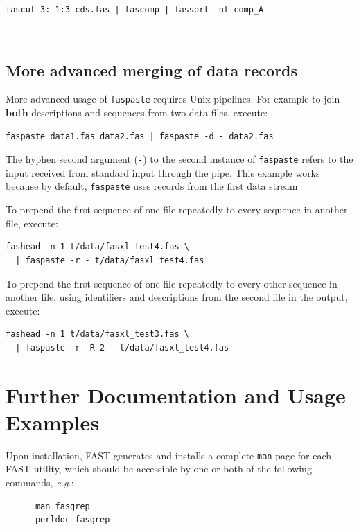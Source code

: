\documentclass{frontiersSCNS} %
\begin{document}
\begin{verbatim}
fascut 3:-1:3 cds.fas | fascomp | fassort -nt comp_A
\end{verbatim}
\\
\subsection{More advanced merging of data records}

More advanced usage of {\tt faspaste} requires Unix pipelines. For
example to join {\bf both} descriptions and sequences from two
data-files, execute:

\begin{verbatim}
faspaste data1.fas data2.fas | faspaste -d - data2.fas
\end{verbatim}

\noindent The hyphen second argument (\verb|-|) to the second instance
of {\tt faspaste} refers to the input received from standard input
through the pipe. This example works because by default,  {\tt  faspaste} uses records from the first data stream 

\noindent To prepend the first sequence of one file repeatedly to every sequence in another
file, execute:

\begin{verbatim}
fashead -n 1 t/data/fasxl_test4.fas \ 
  | faspaste -r - t/data/fasxl_test4.fas
\end{verbatim}

\noindent To prepend the first sequence of one file repeatedly to
every other sequence in another file, using identifiers and
descriptions from the second file in the output, execute:

\begin{verbatim}
fashead -n 1 t/data/fasxl_test3.fas \ 
  | faspaste -r -R 2 - t/data/fasxl_test4.fas
\end{verbatim}

\section{Further Documentation and Usage Examples}

Upon installation, FAST generates and installs a complete {\tt man}
page for each FAST utility, which should be accessible by one or both
of the following commands, {\it e.g.}:

\begin{verbatim}
      man fasgrep
      perldoc fasgrep
\end{verbatim}
\end{document}
